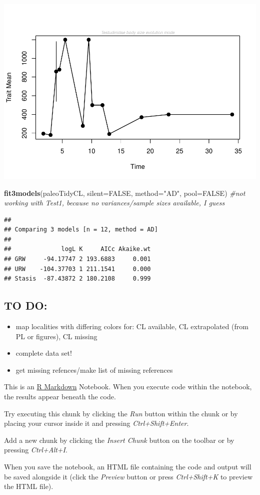 \documentclass[]{article}
\newenvironment{Shaded}{\begin{snugshade}}{\end{snugshade}}
\newcommand{\KeywordTok}[1]{\textcolor[rgb]{0.13,0.29,0.53}{\textbf{{#1}}}}
\newcommand{\DataTypeTok}[1]{\textcolor[rgb]{0.13,0.29,0.53}{{#1}}}
\newcommand{\StringTok}[1]{\textcolor[rgb]{0.31,0.60,0.02}{{#1}}}
\newcommand{\CommentTok}[1]{\textcolor[rgb]{0.56,0.35,0.01}{\textit{{#1}}}}
\newcommand{\OtherTok}[1]{\textcolor[rgb]{0.56,0.35,0.01}{{#1}}}
\newcommand{\NormalTok}[1]{{#1}}
\providecommand{\tightlist}{%
  \setlength{\itemsep}{0pt}\setlength{\parskip}{0pt}}
\begin{document}
\includegraphics{tortoise_notes_files/figure-latex/unnamed-chunk-9-1.pdf}

\begin{Shaded}
\begin{Highlighting}[]
\KeywordTok{fit3models}\NormalTok{(paleoTidyCL, }\DataTypeTok{silent=}\OtherTok{FALSE}\NormalTok{, }\DataTypeTok{method=}\StringTok{"AD"}\NormalTok{, }\DataTypeTok{pool=}\OtherTok{FALSE}\NormalTok{)   }\CommentTok{#not working with Test1, because no variances/sample sizes available, I guess}
\end{Highlighting}
\end{Shaded}

\begin{verbatim}
## 
## Comparing 3 models [n = 12, method = AD]
## 
##              logL K     AICc Akaike.wt
## GRW     -94.17747 2 193.6883     0.001
## URW    -104.37703 1 211.1541     0.000
## Stasis  -87.43872 2 180.2108     0.999
\end{verbatim}

\subsection{TO DO:}\label{to-do-1}

\begin{itemize}
\tightlist
\item
  map localities with differing colors for: CL available, CL
  extrapolated (from PL or figures), CL missing
\item
  complete data set!
\item
  get missing refences/make list of missing references
\end{itemize}

This is an \href{http://rmarkdown.rstudio.com}{R Markdown} Notebook.
When you execute code within the notebook, the results appear beneath
the code.

Try executing this chunk by clicking the \emph{Run} button within the
chunk or by placing your cursor inside it and pressing
\emph{Ctrl+Shift+Enter}.

Add a new chunk by clicking the \emph{Insert Chunk} button on the
toolbar or by pressing \emph{Ctrl+Alt+I}.

When you save the notebook, an HTML file containing the code and output
will be saved alongside it (click the \emph{Preview} button or press
\emph{Ctrl+Shift+K} to preview the HTML file).
\end{document}
